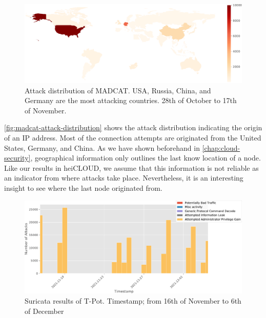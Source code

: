 \begin{figure}[ht]
    \centering
    \includegraphics[width=\textwidth]{figures/madcat-overview-map.pdf}
    \caption[Attack distribution of MADCAT]{Attack distribution of MADCAT. USA, Russia, China, and Germany are the most attacking countries. 28th of October to 17th of November.}
    \label{fig:madcat-attack-distribution}
\end{figure}

\autoref{fig:madcat-attack-distribution} shows the attack distribution indicating the origin of an IP address.
Most of the connection attempts are originated from the United States, Germany, and China.
As we have shown beforehand in \autoref{chap:cloud-security}, geographical information only outlines the last know location of a node.
Like our results in heiCLOUD, we assume that this information is not reliable as an indicator from where attacks take place.
Nevertheless, it is an interesting insight to see where the last node originated from.

\begin{figure}[ht]
    \centering
    \includegraphics[width=\textwidth]{figures/madcat-suricata-alerts.pdf}
    \caption[Suricata results of T-Pot]{Suricata results of T-Pot. Timestamp; from 16th of November to 6th of December}
    \label{fig:suricata-distribution}
\end{figure}

